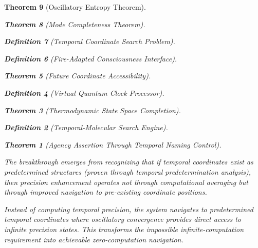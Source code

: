 \documentclass[12pt,a4paper]{article}
\newtheorem{theorem}{Theorem}[section]
\newtheorem{definition}[theorem]{Definition}
\begin{document}
\begin{theorem}[Oscillatory Entropy Theorem]
\begin{theorem}[Mode Completeness Theorem]
\begin{enumerate}
\begin{definition}[Temporal Coordinate Search Problem]
\begin{algorithm}
\begin{definition}[Fire-Adapted Consciousness Interface]
\begin{theorem}[Future Coordinate Accessibility]
\begin{definition}[Virtual Quantum Clock Processor]
\begin{itemize}
\begin{itemize}
\begin{theorem}[Thermodynamic State Space Completion]
\begin{definition}[Temporal-Molecular Search Engine]
\begin{theorem}[Agency Assertion Through Temporal Naming Control]
\begin{remark}
The breakthrough emerges from recognizing that if temporal coordinates exist as predetermined structures (proven through temporal predetermination analysis), then precision enhancement operates not through computational averaging but through improved navigation to pre-existing coordinate positions.

Instead of computing temporal precision, the system navigates to predetermined temporal coordinates where oscillatory convergence provides direct access to infinite precision states. This transforms the impossible infinite-computation requirement into achievable zero-computation navigation.

\begin{figure}[h]
\centering
{}
\end{figure}
\end{remark}
\end{theorem}
\end{definition}
\end{theorem}
\end{itemize}
\end{itemize}
\end{definition}
\end{theorem}
\end{definition}
\end{algorithm}
\end{definition}
\end{enumerate}
\end{theorem}
\end{theorem}
\end{document}
